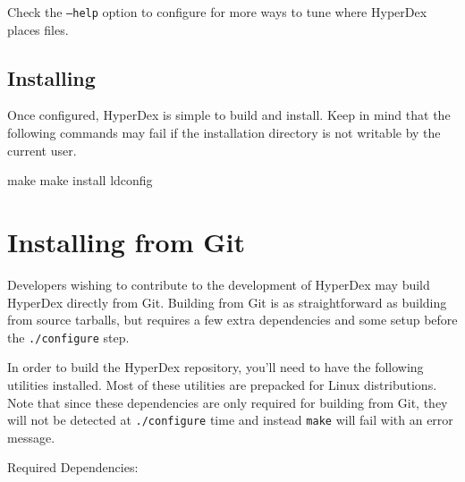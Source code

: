 Check the \texttt{--help} option to configure for more ways to tune where
HyperDex places files.

\subsection{Installing}
\label{sec:installation:source:make}

Once configured, HyperDex is simple to build and install.  Keep in mind that the
following commands may fail if the installation directory is not writable by the
current user.

\begin{consolecode}
make
make install
ldconfig
\end{consolecode}

\section{Installing from Git}
\label{sec:installation:git}

Developers wishing to contribute to the development of HyperDex may build
HyperDex directly from Git.  Building from Git is as straightforward as building
from source tarballs, but requires a few extra dependencies and some setup
before the \texttt{./configure} step.

In order to build the HyperDex repository, you'll need to have the following
utilities installed.  Most of these utilities are prepacked for Linux
distributions.  Note that since these dependencies are only required for
building from Git, they will not be detected at \texttt{./configure} time and
instead \texttt{make} will fail with an error message.

Required Dependencies:

